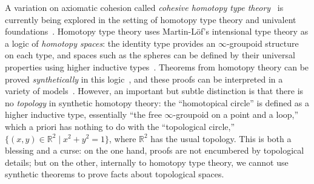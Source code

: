 \documentclass{drl-common/llncs}
\begin{document}
A variation on axiomatic cohesion called \emph{cohesive homotopy type
  theory}~\citep{schreibershulman12cohesive,shulman15realcohesion} is
currently being explored in the setting of homotopy type theory and
univalent foundations~\citep{voevodsky06homotopy,uf13hott-book}.
Homotopy type theory uses Martin-L\"of's intensional type theory as a
logic of \emph{homotopy spaces}: the identity type provides an
$\infty$-groupoid structure on each type, and spaces such as the spheres
can be defined by their universal properties using higher inductive
types~\citep{lumsdaine+13hits,shulman11hitsblog,lumsdaine11hitsblog}.
Theorems from homotopy theory can be proved \emph{synthetically} in this
logic~\citep{ls13pi1s1,lb13pinsn,lf14emspace,lb15cubical,favonia14covering,cavallo14mayervietoris},
and these proofs can be interpreted in a variety of
models~\citep{shulman13inversediag,voevodsky+12simpluniv,coquand+13cubical}.
However, an important but subtle distinction is that there is no
\emph{topology} in synthetic homotopy theory: the ``homotopical circle''
is defined as a higher inductive type, essentially ``the free
$\infty$-groupoid on a point and a loop,'' which a priori has nothing to
do with the ``topological circle,'' $\{ (x,y) \in \mathbb{R}^2 \mid x^2
+ y^2 = 1\}$, where $\mathbb{R}^2$ has the usual topology.  This is both
a blessing and a curse: on the one hand, proofs are not encumbered by
topological details; but on the other, internally to homotopy type
theory, we cannot use synthetic theorems to prove facts about
topological spaces.
\end{document}
